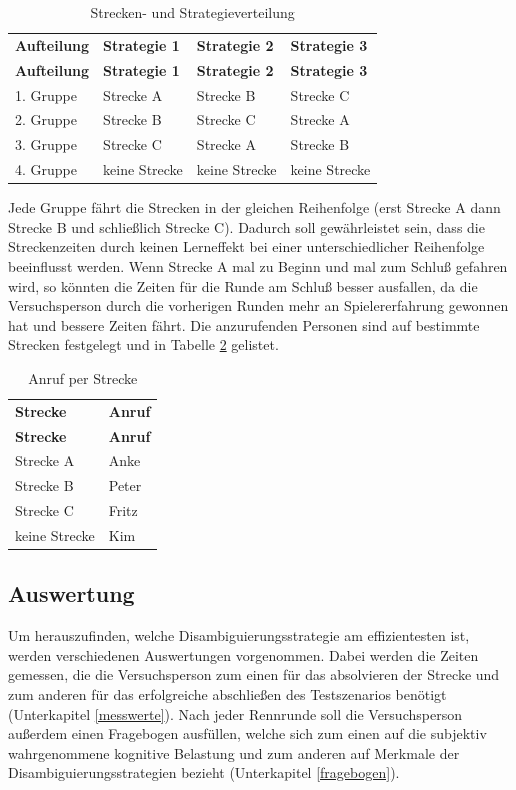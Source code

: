 \documentclass[12pt,a4paper]{scrartcl}
\begin{document}
\begin{longtable}{p{3cm}p{3cm}p{3cm}p{3cm} }
	\label{ablauf}\\
	\caption[Strecken- und Strategieverteilung]{Strecken- und Strategieverteilung}\\
	\hline
	\textbf{Aufteilung}&\textbf{Strategie 1}&\textbf{Strategie 2} &\textbf{Strategie 3}\\
	\hline
	\endfirsthead
	\hline
	\textbf{Aufteilung}&\textbf{Strategie 1}&\textbf{Strategie 2} &\textbf{Strategie 3}\\
	\hline
	\endhead
1. Gruppe & Strecke A & Strecke B & Strecke C \\
2. Gruppe & Strecke B & Strecke C & Strecke A \\
3. Gruppe  & Strecke C & Strecke A & Strecke B \\
4. Gruppe   & keine Strecke & keine Strecke & keine Strecke\\ 
\hline
\end{longtable}

Jede Gruppe fährt die Strecken in der gleichen Reihenfolge (erst Strecke A dann Strecke B und schließlich Strecke C). Dadurch soll gewährleistet sein, dass die Streckenzeiten durch keinen Lerneffekt bei einer unterschiedlicher Reihenfolge beeinflusst werden. Wenn Strecke A mal zu Beginn und mal zum Schluß gefahren wird, so könnten die Zeiten für die Runde am Schluß besser ausfallen, da die Versuchsperson durch die vorherigen Runden mehr an Spielererfahrung gewonnen hat und bessere Zeiten fährt. Die anzurufenden Personen sind auf bestimmte Strecken festgelegt und in Tabelle \ref{anrufstrecke} gelistet. 

\begin{longtable}{p{6cm}p{6cm}}
	\label{anrufstrecke}\\
	\caption[Anruf per Strecke]{Anruf per Strecke}\\
	\hline
	\textbf{Strecke} &	\textbf{Anruf}\\
	\hline
	\endfirsthead
	\hline
	\textbf{Strecke} &	\textbf{Anruf}\\
	\hline
	\endhead
Strecke A & Anke\\
Strecke B & Peter\\
Strecke C & Fritz\\
keine Strecke & Kim\\


\hline
\end{longtable}

\subsection{Auswertung}
Um herauszufinden, welche Disambiguierungsstrategie am effizientesten ist, werden verschiedenen Auswertungen vorgenommen. 
Dabei werden die Zeiten gemessen, die die Versuchsperson zum einen für das absolvieren der Strecke und zum anderen für das erfolgreiche abschließen des Testszenarios benötigt (Unterkapitel \ref{messwerte}).
Nach jeder Rennrunde soll die Versuchsperson außerdem einen Fragebogen ausfüllen, welche sich zum einen auf die subjektiv wahrgenommene kognitive Belastung und zum anderen auf Merkmale der Disambiguierungsstrategien bezieht (Unterkapitel \ref{fragebogen}). 
\end{document}
